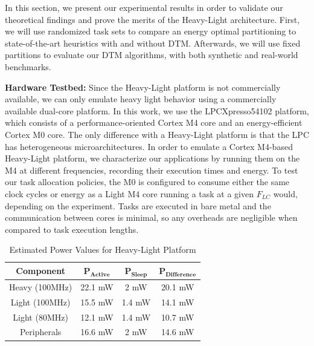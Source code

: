
In this section, we present our experimental results in order to validate our theoretical findings and prove the merits of the Heavy-Light architecture. First, we will use randomized task sets to compare an energy optimal partitioning to state-of-the-art heuristics with and without DTM. Afterwards, we will use fixed partitions to evaluate our DTM algorithms, with both synthetic and real-world benchmarks.

\noindent\textbf{Hardware Testbed:}
Since the Heavy-Light platform is not commercially available, we can only emulate heavy light behavior using a commercially available dual-core platform. In this work, we use the LPCXpresso54102 platform, which consists of a performance-oriented Cortex M4 core and an energy-efficient Cortex M0 core. 
The only difference with a Heavy-Light platform is that the LPC has heterogeneous microarchitectures. In order to emulate a Cortex M4-based Heavy-Light platform, we characterize our applications by running them on the M4 at different frequencies, recording their execution times and energy. To test our task allocation policies, the M0 is configured to consume either the same clock cycles or energy as a Light M4 core running a task at a given $F_{LC}$ would, depending on the experiment. Tasks are executed in bare metal and the communication between cores is minimal, so any overheads are negligible when compared to task execution lengths.

\begin{table}[!t]
	\centering
	\caption{Estimated Power Values for Heavy-Light Platform}
	\label{tab:power_numbers_exp}
	\begin{tabular}{|c|c|c|c|} \hline
		\textbf{Component} & $\mathbf{P_\mathrm{\mathbf{Active}}}$ & $\mathbf{P_\mathrm{\mathbf{Sleep}}}$ & $\mathbf{P_\mathrm{\mathbf{Difference}}}$\\ 
		\hline
		Heavy (100MHz)& 22.1 mW & 2 mW & 20.1 mW\\
		\hline
		Light (100MHz) & 15.5 mW & 1.4 mW & 14.1 mW\\ 
		\hline
		Light (80MHz) & 12.1 mW & 1.4 mW & 10.7 mW\\ 
		\hline
		Peripherals & 16.6 mW & 2 mW & 14.6 mW\\ 
		\hline
	\end{tabular}
\end{table}

